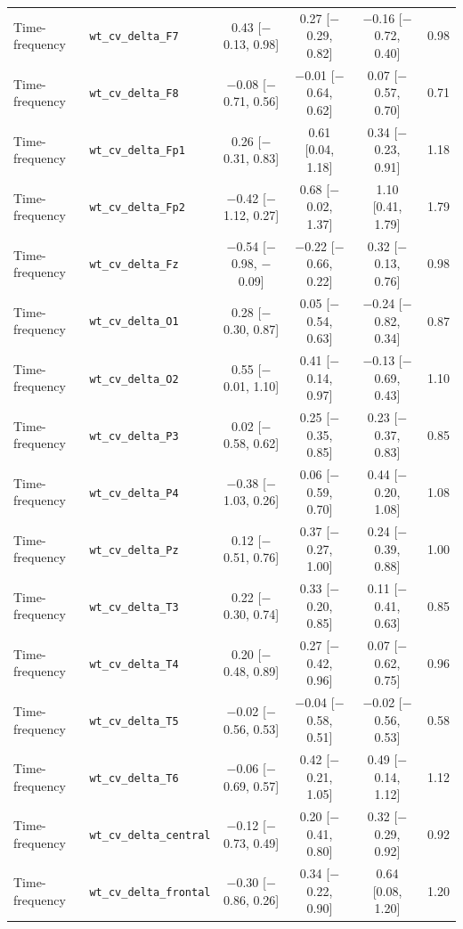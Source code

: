 {\begin{longtable}{llcccc}
Time-frequency & \texttt{wt\_cv\_delta\_F7} & 0.43 [$-$0.13, 0.98] & 0.27 [$-$0.29, 0.82] & $-$0.16 [$-$0.72, 0.40] & 0.98 \\
Time-frequency & \texttt{wt\_cv\_delta\_F8} & $-$0.08 [$-$0.71, 0.56] & $-$0.01 [$-$0.64, 0.62] & 0.07 [$-$0.57, 0.70] & 0.71 \\
Time-frequency & \texttt{wt\_cv\_delta\_Fp1} & 0.26 [$-$0.31, 0.83] & 0.61 [0.04, 1.18] & 0.34 [$-$0.23, 0.91] & 1.18 \\
Time-frequency & \texttt{wt\_cv\_delta\_Fp2} & $-$0.42 [$-$1.12, 0.27] & 0.68 [$-$0.02, 1.37] & 1.10 [0.41, 1.79] & 1.79 \\
Time-frequency & \texttt{wt\_cv\_delta\_Fz} & $-$0.54 [$-$0.98, $-$0.09] & $-$0.22 [$-$0.66, 0.22] & 0.32 [$-$0.13, 0.76] & 0.98 \\
Time-frequency & \texttt{wt\_cv\_delta\_O1} & 0.28 [$-$0.30, 0.87] & 0.05 [$-$0.54, 0.63] & $-$0.24 [$-$0.82, 0.34] & 0.87 \\
Time-frequency & \texttt{wt\_cv\_delta\_O2} & 0.55 [$-$0.01, 1.10] & 0.41 [$-$0.14, 0.97] & $-$0.13 [$-$0.69, 0.43] & 1.10 \\
Time-frequency & \texttt{wt\_cv\_delta\_P3} & 0.02 [$-$0.58, 0.62] & 0.25 [$-$0.35, 0.85] & 0.23 [$-$0.37, 0.83] & 0.85 \\
Time-frequency & \texttt{wt\_cv\_delta\_P4} & $-$0.38 [$-$1.03, 0.26] & 0.06 [$-$0.59, 0.70] & 0.44 [$-$0.20, 1.08] & 1.08 \\
Time-frequency & \texttt{wt\_cv\_delta\_Pz} & 0.12 [$-$0.51, 0.76] & 0.37 [$-$0.27, 1.00] & 0.24 [$-$0.39, 0.88] & 1.00 \\
Time-frequency & \texttt{wt\_cv\_delta\_T3} & 0.22 [$-$0.30, 0.74] & 0.33 [$-$0.20, 0.85] & 0.11 [$-$0.41, 0.63] & 0.85 \\
Time-frequency & \texttt{wt\_cv\_delta\_T4} & 0.20 [$-$0.48, 0.89] & 0.27 [$-$0.42, 0.96] & 0.07 [$-$0.62, 0.75] & 0.96 \\
Time-frequency & \texttt{wt\_cv\_delta\_T5} & $-$0.02 [$-$0.56, 0.53] & $-$0.04 [$-$0.58, 0.51] & $-$0.02 [$-$0.56, 0.53] & 0.58 \\
Time-frequency & \texttt{wt\_cv\_delta\_T6} & $-$0.06 [$-$0.69, 0.57] & 0.42 [$-$0.21, 1.05] & 0.49 [$-$0.14, 1.12] & 1.12 \\
Time-frequency & \texttt{wt\_cv\_delta\_central} & $-$0.12 [$-$0.73, 0.49] & 0.20 [$-$0.41, 0.80] & 0.32 [$-$0.29, 0.92] & 0.92 \\
Time-frequency & \texttt{wt\_cv\_delta\_frontal} & $-$0.30 [$-$0.86, 0.26] & 0.34 [$-$0.22, 0.90] & 0.64 [0.08, 1.20] & 1.20 \\

\end{longtable}}
